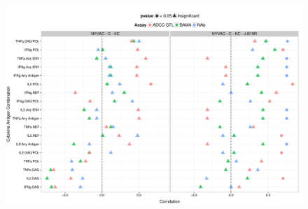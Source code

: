 \documentclass[11pt]{article}\usepackage[]{graphicx}\usepackage[]{color}
\makeatletter
\def\maxwidth{ %
  \ifdim\Gin@nat@width>\linewidth
    \linewidth
  \else
    \Gin@nat@width
  \fi
}
\newenvironment{knitrout}{}{} %
\makeatother
\begin{document}
\begin{landscape}
% 
% 
% 

\begin{figure}[H]
\begin{center}
\begin{knitrout}
\color{fgcolor}
\includegraphics[width=\maxwidth]{figure/corrplot_CD4-1} 


\end{knitrout}
\end{center}
\end{figure}
\end{landscape}
\end{document}
